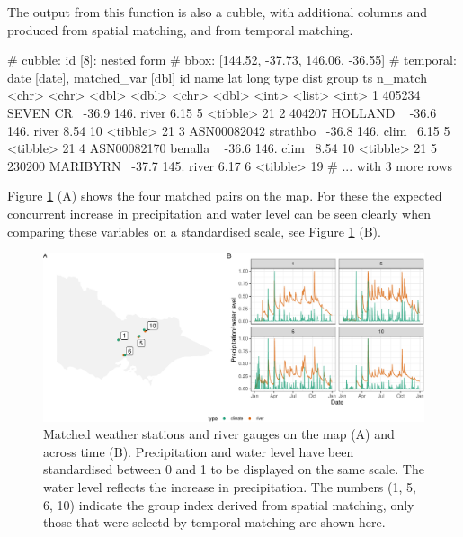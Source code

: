 \documentclass[
]{jss}
\begin{document}
The output from this function is also a cubble, with additional columns  and  produced from spatial matching, and  from temporal matching.

\begin{CodeChunk}
\begin{CodeOutput}
# cubble:   id [8]: nested form
# bbox:     [144.52, -37.73, 146.06, -36.55]
# temporal: date [date], matched_var [dbl]
  id          name        lat  long type   dist group ts       n_match
  <chr>       <chr>     <dbl> <dbl> <chr> <dbl> <int> <list>     <int>
1 405234      SEVEN CR~ -36.9  146. river  6.15     5 <tibble>      21
2 404207      HOLLAND ~ -36.6  146. river  8.54    10 <tibble>      21
3 ASN00082042 strathbo~ -36.8  146. clim~  6.15     5 <tibble>      21
4 ASN00082170 benalla ~ -36.6  146. clim~  8.54    10 <tibble>      21
5 230200      MARIBYRN~ -37.7  145. river  6.17     6 <tibble>      19
# ... with 3 more rows
\end{CodeOutput}
\end{CodeChunk}

Figure \ref{fig:matching} (A) shows the four matched pairs on the map. For these the expected concurrent increase in precipitation and water level can be seen clearly when comparing these variables on a standardised scale, see Figure \ref{fig:matching} (B).

\begin{CodeChunk}
\begin{figure}

{\centering \includegraphics{figures/matching-1} 

}

\caption[Matched weather stations and river gauges on the map (A) and across time (B)]{Matched weather stations and river gauges on the map (A) and across time (B). Precipitation and water level have been standardised between 0 and 1 to be displayed on the same scale. The water level reflects the increase in precipitation. The numbers (1, 5, 6, 10) indicate the group index derived from spatial matching, only those that were selectd by temporal matching are shown here.}\label{fig:matching}
\end{figure}
\end{CodeChunk}
\end{document}
